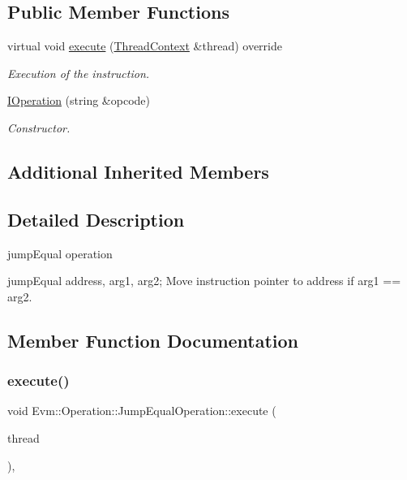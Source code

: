 \subsection*{Public Member Functions}
\begin{DoxyCompactItemize}
\item 
virtual void \mbox{\hyperlink{struct_evm_1_1_operation_1_1_jump_equal_operation_a5edc133dd24ca78cc59203ab3ba47763}{execute}} (\mbox{\hyperlink{struct_evm_1_1_thread_context}{Thread\+Context}} \&thread) override
\begin{DoxyCompactList}\small\item\em Execution of the instruction. \end{DoxyCompactList}\item 
\mbox{\hyperlink{struct_evm_1_1_operation_1_1_jump_equal_operation_a65e98ee1b1679e12c1d1dd000ebfe937}{I\+Operation}} (string \&opcode)
\begin{DoxyCompactList}\small\item\em Constructor. \end{DoxyCompactList}\end{DoxyCompactItemize}
\subsection*{Additional Inherited Members}


\subsection{Detailed Description}
jump\+Equal operation 

jump\+Equal address, arg1, arg2; Move instruction pointer to address if arg1 == arg2. 

\subsection{Member Function Documentation}
\mbox{\label{struct_evm_1_1_operation_1_1_jump_equal_operation_a5edc133dd24ca78cc59203ab3ba47763}} 
\subsubsection{\texorpdfstring{execute()}{execute()}}
{\footnotesize\ttfamily void Evm\+::\+Operation\+::\+Jump\+Equal\+Operation\+::execute (\begin{DoxyParamCaption}\item[{\mbox{\hyperlink{struct_evm_1_1_thread_context}{Thread\+Context}} \&}]{thread }\end{DoxyParamCaption})\hspace{0.3cm}{\ttfamily [override]}, {\ttfamily [virtual]}}



